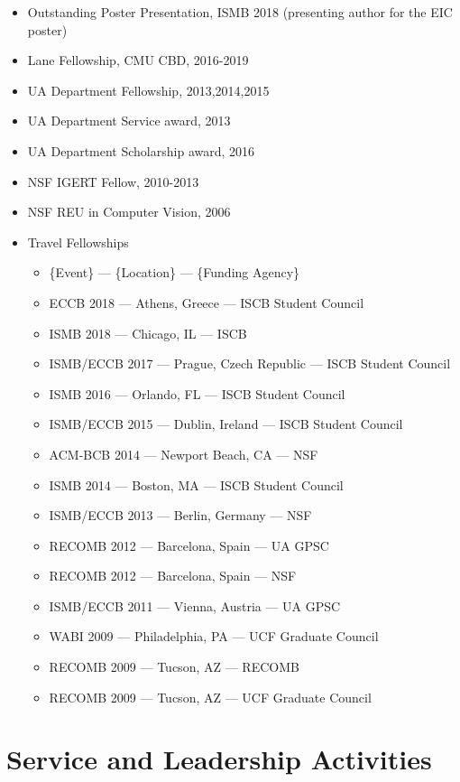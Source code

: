 \documentclass[10pt,letterpaper]{article}
\begin{document}
\begin{itemize}
    \item Outstanding Poster Presentation, ISMB 2018 (presenting author for the EIC poster)
    \item Lane Fellowship, CMU CBD, 2016-2019
    \item UA Department Fellowship, 2013,2014,2015
    \item UA Department Service award, 2013
    \item UA Department Scholarship award, 2016
    \item NSF IGERT Fellow, 2010-2013
    \item NSF REU in Computer Vision, 2006
    \item Travel Fellowships
    \begin{itemize}
    	\item \{Event\} --- \{Location\} --- \{Funding Agency\}
    	\item ECCB 2018 --- Athens, Greece --- ISCB Student Council
    	\item ISMB 2018 --- Chicago, IL --- ISCB
	\item ISMB/ECCB 2017 --- Prague, Czech Republic --- ISCB Student Council 
	\item ISMB 2016 --- Orlando, FL --- ISCB Student Council
	\item ISMB/ECCB 2015 --- Dublin, Ireland --- ISCB Student Council
	\item ACM-BCB 2014 --- Newport Beach, CA --- NSF
	\item ISMB 2014 --- Boston, MA --- ISCB Student Council 
	\item ISMB/ECCB 2013 --- Berlin, Germany --- NSF
	\item RECOMB 2012 --- Barcelona, Spain --- UA GPSC
	\item RECOMB 2012 --- Barcelona, Spain --- NSF
	\item ISMB/ECCB 2011 --- Vienna, Austria --- UA GPSC
	\item WABI 2009 --- Philadelphia, PA --- UCF Graduate Council 
	\item RECOMB 2009 --- Tucson, AZ --- RECOMB
	\item RECOMB 2009 --- Tucson, AZ --- UCF Graduate Council
    \end{itemize}
\end{itemize}

\section*{Service and Leadership Activities}
\end{document}
